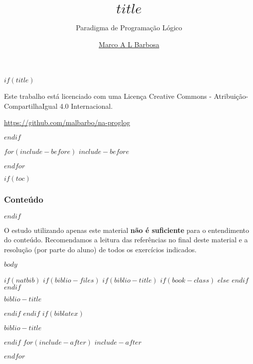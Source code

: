 \documentclass[$if(fontsize)$$fontsize$,$endif$$if(handout)$handout,$endif$$if(beamer)$ignorenonframetext,$endif$$for(classoption)$$classoption$$sep$,$endfor$]{$documentclass$}
\title{$title$}
\subtitle{Paradigma de Programação Lógico}
\author{\href{malbarbo.pro.br}{Marco A L Barbosa}}
\date{}
\begin{document}
$if(title)$
\begin{frame}[plain]
  \vspace{1.5cm}
  \titlepage
  \begin{center} 
    \href{http://creativecommons.org/licenses/by-sa/4.0/}{\ccbysa}

    {\tiny
      Este trabalho está licenciado com uma Licença Creative Commons -
      Atribuição-CompartilhaIgual 4.0 Internacional.

      \url{https://github.com/malbarbo/na-proglog}
    }
  \end{center}
\end{frame}
$endif$

$for(include-before)$
$include-before$

$endfor$

$if(toc)$
\begin{frame}[plain]
  \frametitle{Conteúdo}
  \tableofcontents
\end{frame}
$endif$

\begin{frame}

  O estudo utilizando apenas este material \textbf{não é suficiente} para o
  entendimento do conteúdo. Recomendamos a leitura das referências no final
  deste material e a resolução (por parte do aluno) de todos os exercícios
  indicados.

\end{frame}

$body$

$if(natbib)$
$if(biblio-files)$
$if(biblio-title)$
$if(book-class)$
\renewcommand\bibname{$biblio-title$}
$else$
\renewcommand\refname{$biblio-title$}
$endif$
$endif$
\begin{frame}[allowframebreaks]{$biblio-title$}

\end{frame}

$endif$
$endif$
$if(biblatex)$
\begin{frame}[allowframebreaks]{$biblio-title$}
\printbibliography[heading=none]
\end{frame}

$endif$
$for(include-after)$
$include-after$

$endfor$
\end{document}
